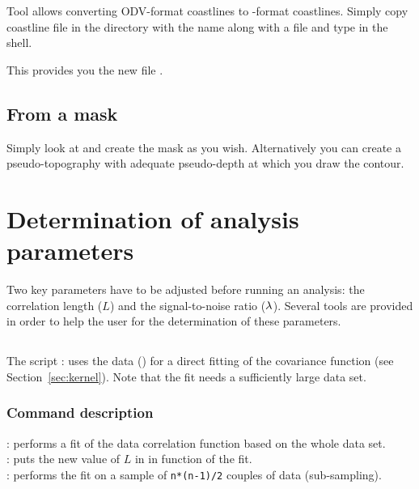 Tool  allows converting ODV-format coastlines to \diva-format coastlines. Simply copy coastline file in the  directory with the name  along with a  file and type  in the shell. 

This provides you the new file .



\subsection{From a mask}

Simply look at  and create the mask as you wish. Alternatively you can
create a pseudo-topography with adequate pseudo-depth at which you draw the contour.


\section{Determination of analysis parameters}

Two key parameters have to be adjusted before running an analysis: the correlation length ($L$) and the signal-to-noise ratio ($\lambda$). Several tools are provided in order to help the user for the determination of these parameters.


\subsection{ \label{sec:divafit}}

The script : uses the data () for a direct fitting of the covariance function (see Section~\ref{sec:kernel}). Note that the fit needs a sufficiently large data set.

\subsubsection{Command description}

 \qquad: performs a fit of the data correlation function based on the whole data set. \\
 \qquad: puts the new value of $L$ in  in function of the fit.\\
 \qquad: performs the fit on a sample of \texttt{n*(n-1)/2} couples of data (sub-sampling). 

